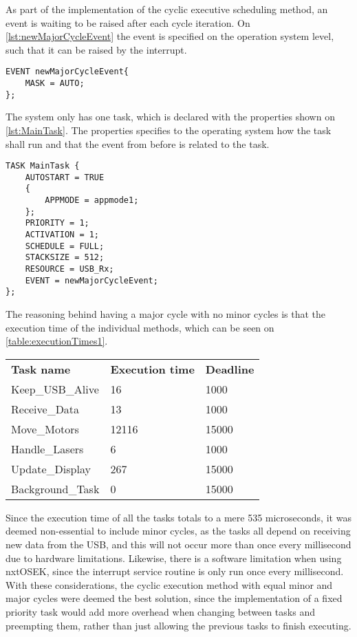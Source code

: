 As part of the implementation of the cyclic executive scheduling method, an event is waiting to be raised after each cycle iteration.
On \autoref{lst:newMajorCycleEvent} the event is specified on the operation system level, such that it can be raised by the interrupt.
\begin{lstlisting}[language=CSharp,label={lst:newMajorCycleEvent},caption={newMajorCycleEvent event from nxt.oil}]
EVENT newMajorCycleEvent{
    MASK = AUTO;
};
\end{lstlisting}

The system only has one task, which is declared with the properties shown on \autoref{lst:MainTask}.
The properties specifies to the operating system how the task shall run and that the event from before is related to the task.
\begin{lstlisting}[language=CSharp,label={lst:MainTaskoil},caption={MainTaks task from nxt.oil}]
TASK MainTask {
    AUTOSTART = TRUE
    {
        APPMODE = appmode1;
    };
    PRIORITY = 1;
    ACTIVATION = 1;
    SCHEDULE = FULL;
    STACKSIZE = 512;
    RESOURCE = USB_Rx;
    EVENT = newMajorCycleEvent;
};
\end{lstlisting}

The reasoning behind having a major cycle with no minor cycles is that the execution time of the individual methods, which can be seen on \autoref{table:executionTimes1}.

\begin{table}[H]
\begin{tabular}{lll}
\textbf{Task name}  & \textbf{Execution time} & \textbf{Deadline} \\
Keep\_USB\_Alive    & 16     	& 1000                    \\
Receive\_Data       & 13       & 1000                    \\
Move\_Motors        & 12116    & 15000                   \\
Handle\_Lasers      & 6        & 1000                    \\
Update\_Display     & 267      & 15000                   \\
Background\_Task	 & 0	    & 15000					   \\
\end{tabular}
 \end{table}\label{table:executionTimes1}

Since the execution time of all the tasks totals to a mere 535 microseconds, it was deemed non-essential to include minor cycles, as the tasks all depend on receiving new data from the USB, and this will not occur more than once every millisecond due to hardware limitations.
Likewise, there is a software limitation when using nxtOSEK, since the interrupt service routine is only run once every millisecond.
With these considerations, the cyclic execution method with equal minor and major cycles were deemed the best solution, since the implementation of a fixed priority task would add more overhead when changing between tasks and preempting them, rather than just allowing the previous tasks to finish executing.

